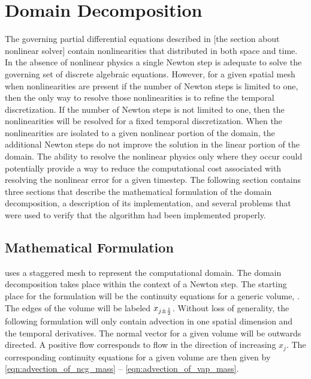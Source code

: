\chapter{Domain Decomposition}
\label{chap:domain_decomposition}
The governing partial differential equations described in [the section about nonlinear solver] contain nonlinearities that distributed in both space and time.
In the absence of nonlinear physics a single Newton step is adequate to solve the governing set of discrete algebraic equations.
However, for a given spatial mesh when nonlinearities are present if the number of Newton steps is limited to one, then the only way to resolve those nonlinearities is to refine the temporal discretization.
If the number of Newton steps is not limited to one, then the nonlinearities will be resolved for a fixed temporal discretization.
When the nonlinearities are isolated to a given nonlinear portion of the domain, the additional Newton steps do not improve the solution in the linear portion of the domain.
The ability to resolve the nonlinear physics only where they occur could potentially provide a way to reduce the computational cost associated with resolving the nonlinear error for a given timestep.
The following section contains three sections that describe the mathematical formulation of the domain decomposition, a description of its implementation, and several problems that were used to verify that the algorithm had been implemented properly.

\section{Mathematical Formulation}
\label{sec:dd:math}

\cobra{} uses a staggered mesh to represent the computational domain.
The domain decomposition takes place within the context of a Newton step.
The starting place for the formulation will be the continuity equations for a generic volume,  .
The edges of the volume will be labeled $x_{j \pm \onehalf}$.
Without loss of generality, the following formulation will only contain advection in one spatial dimension and the temporal derivatives.
The normal vector for a given volume will be outwards directed.
A positive flow corresponds to flow in the direction of increasing $x_{j}$.  
The corresponding continuity equations for a given volume are then given by \eqref{eqn:advection_of_ncg_mass} -- \eqref{eqn:advection_of_vap_mass}.

